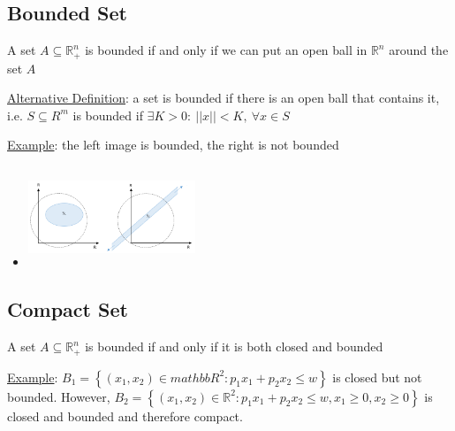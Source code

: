 \documentclass{article}
\begin{document}
\subsection{Bounded Set}
A set $A \subseteq \mathbb{R}_{+}^{n}$ is bounded if and only if we can put an open ball in $\mathbb{R}^{n}$ around the set $A$ \par \vspace{0.3em}
  \underline{Alternative Definition}: a set is bounded if there is an open ball that contains it, i.e. $S \subseteq R^{m}$ is bounded if $\exists K > 0: \ ||x|| < K, \ \forall x \in S$ \par
  \underline{Example}: the left image is bounded, the right is not bounded
  \begin{itemize}
    \item  \includegraphics[width=5cm, height=3cm]{pic5}
  \end{itemize}
  \par
\vspace{6mm}
\subsection{Compact Set}
A set $A \subseteq \mathbb{R}_{+}^{n}$ is bounded if and only if it is both closed and bounded \par \vspace{0.3em}
  \underline{Example}: $B_{1} = \left\{ (x_{1},x_{2}) \in mathbb{R}^{2}: p_{1}x_{1} + p_{2}x_{2} \leq w \right\}$ is closed but not bounded. However, $B_{2} = \left\{ (x_{1},x_{2}) \in \mathbb{R}^{2}: p_{1}x_{1} + p_{2}x_{2} \leq w, x_{1} \geq 0, x_{2} \geq 0 \right\}$ is closed and bounded and therefore compact.
  \par
\vspace{6mm}
\end{document}

